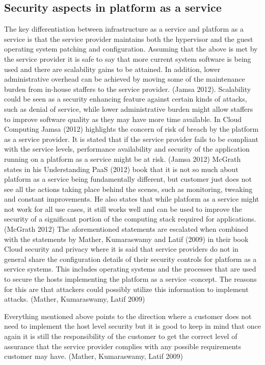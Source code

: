 \documentclass{article}
\begin{document}
\subsection{Security aspects in platform as a service}
The key differentiation between infrastructure as a service and platform as a service is that the service provider maintains both the hypervisor and the guest operating system patching and configuration.
Assuming that the above is met by the service provider it is safe to say that more current system software is being used and there are scalability gains to be attained. In addition, lower administrative overhead can be achieved by moving some of the maintenance burden from in-house staffers to the service provider. (Jamsa 2012). Scalability could be seen as a security enhancing feature against certain kinds of attacks, such as denial of service, while lower administrative burden might allow staffers to improve software quality as they may have more time available.
In Cloud Computing Jamsa (2012) highlights the concern of risk of breach by the platform as a service provider. It is stated that if the service provider fails to be compliant with the service levels, performance availability and security of the application running on a platform as a service might be at risk. (Jamsa 2012)
 McGrath states in his Understanding PaaS (2012) book that it is not so much about platform as a service being fundamentally different, but customer just does not see all the actions taking place behind the scenes, such as monitoring, tweaking and constant improvements. He also states that while platform as a service might not work for all use cases, it still works well and can be used to improve the security of a significant portion of the computing stack required for applications. (McGrath 2012)
The aforementioned statements are escalated when combined with the statements by Mather, Kumaraswamy and Latif (2009) in their book Cloud security and privacy where it is said that service providers do not in general share the configuration details of their security controls for platform as a service systems. This includes operating systems and the processes that are used to secure the hosts implementing the platform as a service -concept. The reasons for this are that attackers could possibly utilize this information to implement attacks. (Mather, Kumaraswamy, Latif 2009)
\par
Everything mentioned above points to the direction where a customer does not need to implement the host level security but it is good to keep in mind that once again it is still the responsibility of the customer to get the correct level of assurance that the service provider complies with any possible requirements customer may have. (Mather, Kumaraswamy, Latif 2009)
\end{document}
